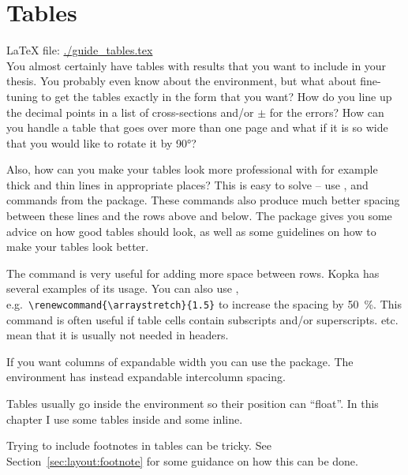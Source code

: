 \chapter{Tables}
\label{sec:table}

\LaTeX{} file: \url{./guide_tables.tex}\\[1ex]
\noindent
You almost certainly have tables with results that you want to include
in your thesis. You probably even know about the 
environment, but what about fine-tuning to get the tables exactly in
the form that you want? How do you line up the decimal points in a
list of cross-sections and/or $\pm$ for the errors? How can you
handle a table that goes over more than one page and what if it is so
wide that you would like to rotate it by \ang{90}?

Also, how can you make your tables look more professional with for
example thick and thin lines in appropriate places? This is easy to
solve -- use ,  and 
commands from the  package. These commands also
produce much better spacing between these lines and the rows above and
below. The  package gives you some advice on how
good tables should look, as well as some guidelines on how to make your
tables look better.

The  command is very useful for adding more space between
rows. Kopka has several examples of its usage. You can also use
, e.g.\ \verb+\renewcommand{\arraystretch}{1.5}+ to
increase the spacing by \SI{50}{\percent}. This command is often useful if table
cells contain subscripts and/or superscripts. 
etc. mean that it is usually not needed in headers.

If you want columns of expandable width you can use the
 package. The environment  has instead
expandable intercolumn spacing.

Tables usually go inside the  environment so their position
can \enquote{float}. In this chapter I use some tables inside 
and some inline.

Trying to include footnotes in tables can be tricky. See
Section~\ref{sec:layout:footnote} for some guidance on how this can be done.


